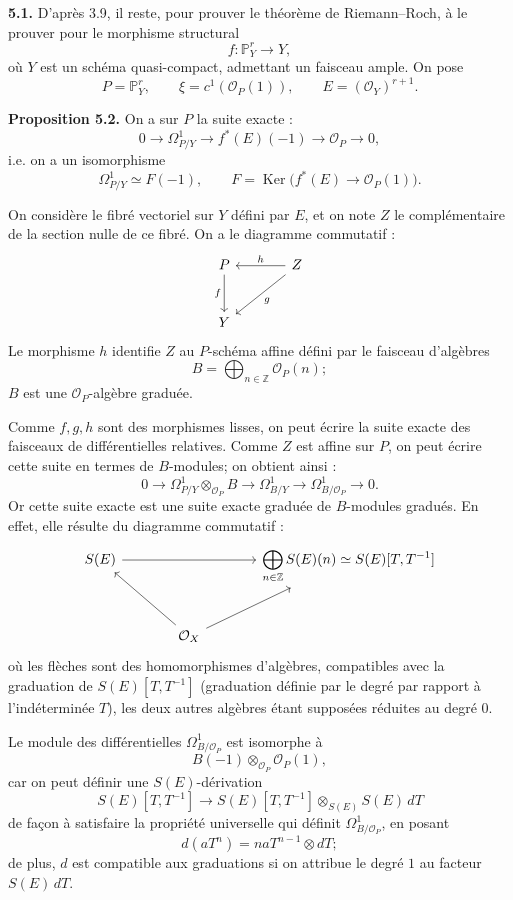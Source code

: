 \documentclass[11pt]{article}
\providecommand{\Ker}{\operatorname{Ker}}
\begin{document}
\textbf{5.1.} D'après 3.9, il reste, pour prouver le théorème de Riemann--Roch, à le prouver pour le morphisme structural
\[
f:\mathbb P^r_Y\longrightarrow Y,
\]
où \(Y\) est un schéma quasi-compact, admettant un faisceau ample. On pose
\[
P=\mathbb P^r_Y,\qquad \xi=c^1(\mathcal O_P(1)),\qquad E=(\mathcal O_Y)^{r+1}.
\]

\textbf{Proposition 5.2.} On a sur \(P\) la suite exacte :
\[
0\longrightarrow\Omega^1_{P/Y}\longrightarrow f^*(E)(-1)\longrightarrow\mathcal O_P\longrightarrow0,
\]
i.e. on a un isomorphisme
\[
\Omega^1_{P/Y}\simeq F(-1),
\qquad
F=\Ker\bigl(f^*(E)\longrightarrow\mathcal O_P(1)\bigr).
\]

On considère le fibré vectoriel sur \(Y\) défini par \(E\), et on note \(Z\) le complémentaire de la section nulle de ce fibré. On a le diagramme commutatif :
\[
\begin{tikzcd}[column sep=large,row sep=large]
P \arrow[d,"f"'] & Z \arrow[l,"h"'] \arrow[dl,"g"]\\
Y &
\end{tikzcd}
\]
Le morphisme \(h\) identifie \(Z\) au \(P\)-schéma affine défini par le faisceau d'algèbres
\[
B=\bigoplus_{n\in\mathbb Z}\mathcal O_P(n);
\]
\(B\) est une \(\mathcal O_P\)-algèbre graduée.

Comme \(f,g,h\) sont des morphismes lisses, on peut écrire la suite exacte des faisceaux de différentielles relatives. Comme \(Z\) est affine sur \(P\), on peut écrire cette suite en termes de \(B\)-modules; on obtient ainsi :
\begin{equation}\tag{5.2.1}
0\longrightarrow
 \Omega^1_{P/Y}\otimes_{\mathcal O_P}B
\longrightarrow
 \Omega^1_{B/Y}
\longrightarrow
 \Omega^1_{B/\mathcal O_P}
\longrightarrow0 .
\end{equation}
Or cette suite exacte est une suite exacte graduée de \(B\)-modules gradués. En effet, elle résulte du diagramme commutatif :
\[
\begin{tikzcd}[column sep=large,row sep=large]
S(E) \arrow[rr] && \displaystyle\bigoplus_{n\in\mathbb Z}S(E)(n)\simeq S(E)[T,T^{-1}]\\
& \mathcal O_X \arrow[ul] \arrow[ur] &
\end{tikzcd}
\]
où les flèches sont des homomorphismes d'algèbres, compatibles avec la graduation de \(S(E)[T,T^{-1}]\) (graduation définie par le degré par rapport à l'indéterminée \(T\)), les deux autres algèbres étant supposées réduites au degré \(0\).

Le module des différentielles \(\Omega^1_{B/\mathcal O_P}\) est isomorphe à
\[
 B(-1)\otimes_{\mathcal O_P}\mathcal O_P(1),
\]
car on peut définir une \(S(E)\)-dérivation
\[
S(E)[T,T^{-1}]
\longrightarrow
S(E)[T,T^{-1}]\otimes_{S(E)}S(E)\,dT
\]
de façon à satisfaire la propriété universelle qui définit \(\Omega^1_{B/\mathcal O_P}\), en posant
\[
 d(aT^n)=naT^{n-1}\otimes dT;
\]
de plus, \(d\) est compatible aux graduations si on attribue le degré \(1\) au facteur \(S(E)\,dT\).
\end{document}
